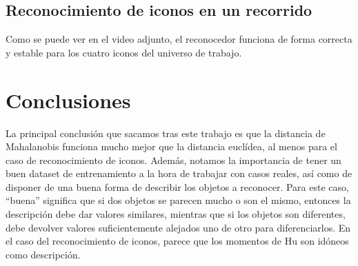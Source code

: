 \documentclass[11pt]{article}
\begin{document}
\subsection{Reconocimiento de iconos en un recorrido}
Como se puede ver en el video adjunto, el reconocedor funciona de forma correcta y estable para los cuatro iconos del universo de trabajo.
\section{Conclusiones}
La principal conclusión que sacamos tras este trabajo es que la distancia de Mahalanobis funciona mucho mejor que la distancia euclídea, al menos para el caso de reconocimiento de iconos. Además, notamos la importancia de tener un buen dataset de entrenamiento a la hora de trabajar con casos reales, así como de disponer de una buena forma de describir los objetos a reconocer. Para este caso, ``buena'' significa que si dos objetos se parecen mucho o son el mismo, entonces la descripción debe dar valores similares, mientras que si los objetos son diferentes, debe devolver valores suficientemente alejados uno de otro para diferenciarlos. En el caso del reconocimiento de iconos, parece que los momentos de Hu son idóneos como descripción.
\end{document}
